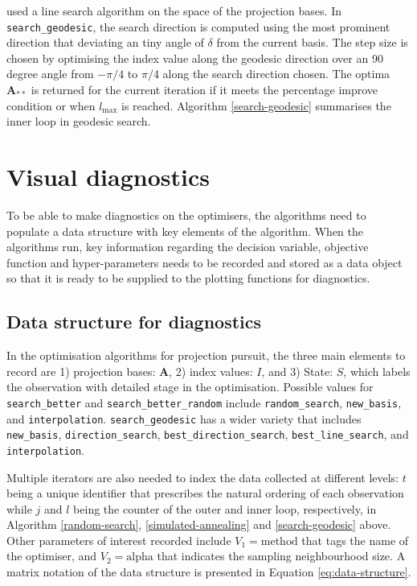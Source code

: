 \citet{cook1995grand} used a line search algorithm on the space of the
projection bases. In \texttt{search\_geodesic}, the search direction is
computed using the most prominent direction that deviating an tiny angle
of \(\delta\) from the current basis. The step size is chosen by
optimising the index value along the geodesic direction over an 90
degree angle from \(-\pi/4\) to \(\pi/4\) along the search direction
chosen. The optima \(\mathbf{A}_{**}\) is returned for the current
iteration if it meets the percentage improve condition or when
\(l_{\max}\) is reached. Algorithm \ref{search-geodesic} summarises the
inner loop in geodesic search.

\hypertarget{vis-diag}{%
\section{Visual diagnostics}\label{vis-diag}}

To be able to make diagnostics on the optimisers, the algorithms need to
populate a data structure with key elements of the algorithm. When the
algorithms run, key information regarding the decision variable,
objective function and hyper-parameters needs to be recorded and stored
as a data object so that it is ready to be supplied to the plotting
functions for diagnostics.

\hypertarget{data-structure-for-diagnostics}{%
\subsection{Data structure for
diagnostics}\label{data-structure-for-diagnostics}}

In the optimisation algorithms for projection pursuit, the three main
elements to record are 1) projection bases: \(\mathbf{A}\), 2) index
values: \(I\), and 3) State: \(S\), which labels the observation with
detailed stage in the optimisation. Possible values for
\texttt{search\_better} and \texttt{search\_better\_random} include
\texttt{random\_search}, \texttt{new\_basis}, and
\texttt{interpolation}. \texttt{search\_geodesic} has a wider variety
that includes \texttt{new\_basis}, \texttt{direction\_search},
\texttt{best\_direction\_search}, \texttt{best\_line\_search}, and
\texttt{interpolation}.

Multiple iterators are also needed to index the data collected at
different levels: \(t\) being a unique identifier that prescribes the
natural ordering of each observation while \(j\) and \(l\) being the
counter of the outer and inner loop, respectively, in Algorithm
\ref{random-search}, \ref{simulated-annealing} and \ref{search-geodesic}
above. Other parameters of interest recorded include
\(V_1 = \text{method}\) that tags the name of the optimiser, and
\(V_2 = \text{alpha}\) that indicates the sampling neighbourhood size. A
matrix notation of the data structure is presented in Equation
\ref{eq:data-structure}.

